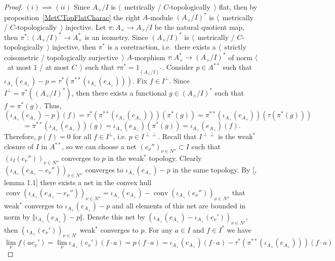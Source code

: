 \begin{proof} $(i)\implies (ii)$  Since $A_\times /I$ is $\langle$~metrically
/ $C$-topologically~$\rangle$ flat, then by proposition~\ref{MetCTopFlatCharac} 
the right $A$-module ${(A_\times /I)}^*$ is $\langle$~metrically /
$C$-topologically~$\rangle$ injective. Let $\pi:A_\times \to A_\times /I$ be the
natural quotient map, then $\pi^*:{(A_\times /I)}^*\to A_\times ^*$ is an
isometry. Since ${(A_\times /I)}^*$ is $\langle$~metrically /
$C$-topologically~$\rangle$ injective, then $\pi^*$ is a coretraction, i.e.\
there exists a $\langle$~strictly coisometric / topologically
surjective~$\rangle$ $A$-morphism $\tau:A_\times ^*\to {(A_\times /I)}^*$ of
norm $\langle$~at most $1$ / at most $C$~$\rangle$ such that
$\tau\pi^*=1_{{(A_\times /I)}^*}$. Consider $p\in A^{**}$ such that
$\iota_{A_\times }(e_{A_\times })-p
=\tau^*(\pi^{**}(\iota_{A_\times }(e_{A_\times })))$. 
Fix $f\in I^\perp$. Since $I^\perp=\pi^*({(A_\times /I)}^*)$, 
then there exists a functional $g\in {(A_\times /I)}^*$ such 
that $f=\pi^*(g)$. Thus,
$$
(\iota_{A_\times }(e_{A_\times })-p)(f)
=\tau^*(\pi^{**}(\iota_{A_\times }(e_{A_\times })))(\pi^*(g))
=\pi^{**}(\iota_{A_\times }(e_{A_\times }))(\tau(\pi^*(g)))
$$
$$
=\pi^{**}(\iota_{A_\times }(e_{A_\times }))(g)
=\iota_{A_\times }(e_{A_\times })(\pi^*(g))
=\iota_{A_\times }(e_{A_\times })(f).
$$
Therefore, $p(f)=0$ for all $f\in I^\perp$, i.e. $p\in I^{\perp\perp}$. Recall
that $I^{\perp\perp}$ is the weak${}^*$ closure of $I$ in $A^{**}$, so we can
choose a net ${(e_\nu'')}_{\nu\in N''}\subset I$ such that
${(\iota_I(e_\nu''))}_{\nu\in N''}$ converges to $p$ in the weak${}^*$ topology.
Clearly ${(\iota_{A_\times }(e_{A_\times }-e_\nu''))}_{\nu\in N''}$ converges to
$\iota_{A_\times }(e_{A_\times })-p$ in the same topology. By
[\cite{PosAndApproxIdinBanAlg}, lemma 1.1] there exists a net in the convex hull
$\operatorname{conv}{
    (\iota_{A_\times }(e_{A_\times }-e_\nu''))
}_{\nu\in N''}
=\iota_{A_\times }(e_{A_\times })
-\operatorname{conv}{(\iota_{A_\times}(e_\nu''))}_{\nu\in N''}$ 
that weak${}^*$ converges to $\iota_{A_\times }(e_{A_\times })-p$ and 
all elements of this net are bounded in norm 
by $\Vert \iota_{A_\times }(e_{A_\times})-p\Vert$. Denote this net by 
${(\iota_{A_\times }(e_{A_\times })-\iota_{A_\times }(e_\nu'))}_{\nu\in N'}$, 
then ${(\iota_{A_\times }(e_\nu'))}_{\nu\in N'}$ weak${}^*$ converges to $p$. 
For any $a\in I$ and $f\in I^*$ we have
$$
\lim_{\nu}f(ae_\nu')
=\lim_{\nu}\iota_{A_\times }(e_\nu')(f\cdot a)
=p(f\cdot a)
=\iota_{A_\times }(e_{A_\times })(f\cdot a)
-\tau^*(\pi^{**}(\iota_{A_\times }(e_{A_\times })))(f\cdot a)
$$
\end{proof}
